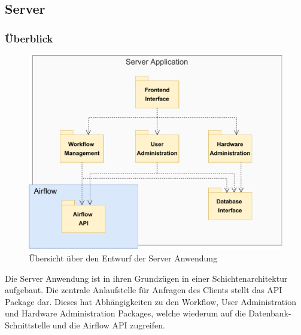 \subsection{Server}

\subsubsection{Überblick}
\begin{figure}[h!]
    \includegraphics[width=1\textwidth]{res/Moduluebersicht.pdf}
    \caption{Übersicht über den Entwurf der Server Anwendung}
\end{figure}
Die Server Anwendung ist in ihren Grundzügen in einer Schichtenarchitektur aufgebaut. 
Die zentrale Anlaufstelle für Anfragen des Clients stellt das API Package dar.
Dieses hat Abhängigkeiten zu den Workflow, User Administration und Hardware Administration Packages, welche wiederum auf die Datenbank-Schnittstelle und die Airflow API zugreifen.

\FloatBarrier
\newpage

